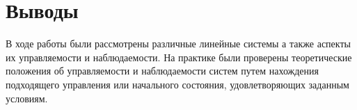 
\FloatBarrier

\FloatBarrier

\FloatBarrier

\FloatBarrier 

\FloatBarrier

\section{Выводы}
В ходе работы были рассмотрены различные линейные системы а также 
аспекты их управляемости и наблюдаемости. На практике были проверены 
теоретические положения об управляемости и наблюдаемости систем путем 
нахождения подходящего управления или начального состояния, удовлетворяющих 
заданным условиям. 